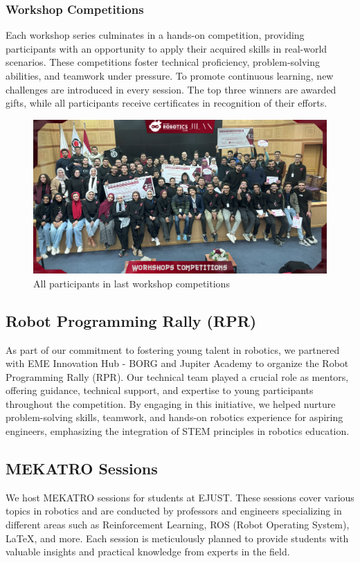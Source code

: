 \documentclass[a4paper,12pt]{article}
\begin{document}
\subsubsection{Workshop Competitions}
Each workshop series culminates in a hands-on competition, providing participants with an opportunity to apply their acquired skills in real-world scenarios. These competitions foster technical proficiency, problem-solving abilities, and teamwork under pressure. To promote continuous learning, new challenges are introduced in every session. The top three winners are awarded gifts, while all participants receive certificates in recognition of their efforts.
\begin{figure}[h]
            \centering
            \includegraphics[width=0.65\linewidth]{workshop competition.jpg}
           \caption{All participants in last workshop competitions}
            \label{fig:enter-label}
                \end{figure}







\newpage
\subsection{Robot Programming Rally (RPR)}
As part of our commitment to fostering young talent in robotics, we partnered with EME Innovation Hub - BORG and Jupiter Academy to organize the Robot Programming Rally (RPR). Our technical team played a crucial role as mentors, offering guidance, technical support, and expertise to young participants throughout the competition. By engaging in this initiative, we helped nurture problem-solving skills, teamwork, and hands-on robotics experience for aspiring engineers, emphasizing the integration of STEM principles in robotics education.

\subsection{MEKATRO Sessions}
We host MEKATRO sessions for students at EJUST. These sessions cover various topics in robotics and are conducted by professors and engineers specializing in different areas such as Reinforcement Learning, ROS (Robot Operating System), LaTeX, and more. Each session is meticulously planned to provide students with valuable insights and practical knowledge from experts in the field.
\end{document}

